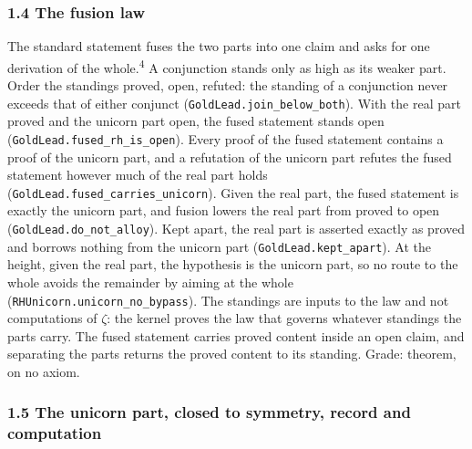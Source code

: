 \documentclass[10pt]{article}
\begin{document}
\hypertarget{the-fusion-law}{%
\subsubsection{1.4 The fusion law}\label{the-fusion-law}}

The standard statement fuses the two parts into one claim and asks for
one derivation of the whole.\textsuperscript{4} A conjunction stands
only as high as its weaker part. Order the standings proved, open,
refuted: the standing of a conjunction never exceeds that of either
conjunct
(\texttt{GoldLead.\allowbreak{}join\_\allowbreak{}below\_\allowbreak{}both}).
With the real part proved and the unicorn part open, the fused statement
stands open
(\texttt{GoldLead.\allowbreak{}fused\_\allowbreak{}rh\_\allowbreak{}is\_\allowbreak{}open}).
Every proof of the fused statement contains a proof of the unicorn part,
and a refutation of the unicorn part refutes the fused statement however
much of the real part holds
(\texttt{GoldLead.\allowbreak{}fused\_\allowbreak{}carries\_\allowbreak{}unicorn}).
Given the real part, the fused statement is exactly the unicorn part,
and fusion lowers the real part from proved to open
(\texttt{GoldLead.\allowbreak{}do\_\allowbreak{}not\_\allowbreak{}alloy}).
Kept apart, the real part is asserted exactly as proved and borrows
nothing from the unicorn part
(\texttt{GoldLead.\allowbreak{}kept\_\allowbreak{}apart}). At the
height, given the real part, the hypothesis is the unicorn part, so no
route to the whole avoids the remainder by aiming at the whole
(\texttt{RHUnicorn.\allowbreak{}unicorn\_\allowbreak{}no\_\allowbreak{}bypass}).
The standings are inputs to the law and not computations of \(\zeta\):
the kernel proves the law that governs whatever standings the parts
carry. The fused statement carries proved content inside an open claim,
and separating the parts returns the proved content to its standing.
Grade: theorem, on no axiom.

\hypertarget{the-unicorn-part-closed-to-symmetry-record-and-computation}{%
\subsubsection{1.5 The unicorn part, closed to symmetry, record and
computation}\label{the-unicorn-part-closed-to-symmetry-record-and-computation}}
\end{document}
